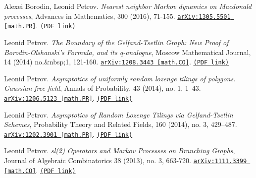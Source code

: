 \begin{etaremune}
\item 
Alexei Borodin, Leonid Petrov.
\emph{Nearest neighbor Markov dynamics on Macdonald processes}, Advances in Mathematics, 300 (2016), 71-155. 
\href{https://arxiv.org/abs/1305.5501}{\texttt{arXiv:1305.5501 [math.PR]}}. \href{https://storage.lpetrov.cc/research_files/Petrov-publ/12-publ-petrov.pdf}{\texttt{(PDF link)}}









\item 
Leonid Petrov.
\emph{The Boundary of the Gelfand-Tsetlin Graph: New Proof of Borodin-Olshanski’s Formula, and its q-analogue}, Moscow Mathematical Journal, 14 (2014) no.&nbsp;1, 121-160. 
\href{https://arxiv.org/abs/1208.3443}{\texttt{arXiv:1208.3443 [math.CO]}}. \href{https://storage.lpetrov.cc/research_files/Petrov-publ/11-publ-petrov.pdf}{\texttt{(PDF link)}}



\item 
Leonid Petrov.
\emph{Asymptotics of uniformly random lozenge tilings of polygons. Gaussian free field}, Annals of Probability, 43 (2014), no. 1, 1–43. 
\href{https://arxiv.org/abs/1206.5123}{\texttt{arXiv:1206.5123 [math.PR]}}. \href{https://storage.lpetrov.cc/research_files/Petrov-publ/10-publ-petrov.pdf}{\texttt{(PDF link)}}





\item 
Leonid Petrov.
\emph{Asymptotics of Random Lozenge Tilings via Gelfand-Tsetlin Schemes}, Probability Theory and Related Fields, 160 (2014), no. 3, 429–487. 
\href{https://arxiv.org/abs/1202.3901}{\texttt{arXiv:1202.3901 [math.PR]}}. \href{https://storage.lpetrov.cc/research_files/Petrov-publ/09-publ-petrov.pdf}{\texttt{(PDF link)}}







\item 
Leonid Petrov.
\emph{sl(2) Operators and Markov Processes on Branching Graphs}, Journal of Algebraic Combinatorics 38 (2013), no. 3, 663-720. 
\href{https://arxiv.org/abs/1111.3399}{\texttt{arXiv:1111.3399 [math.CO]}}. \href{https://storage.lpetrov.cc/research_files/Petrov-publ/08-publ-petrov.pdf}{\texttt{(PDF link)}}








\end{etaremune}
